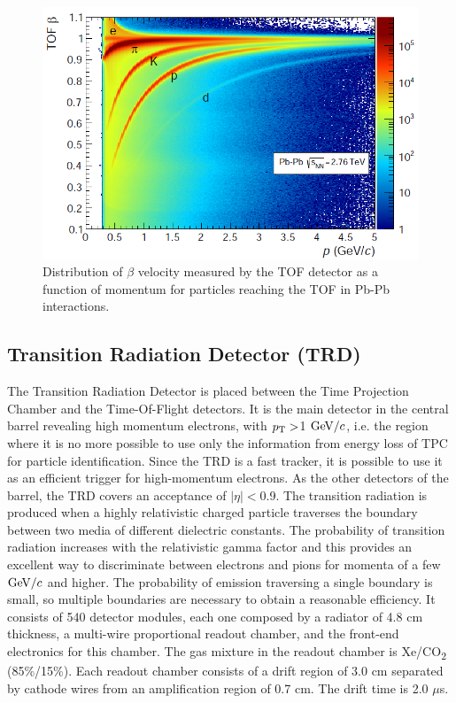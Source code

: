 \begin{figure}[!h]
\centering
\includegraphics[width=.7\textwidth]{FigCap3/TOFpid.png}
\caption{Distribution of $\beta$ velocity measured by the TOF detector as a function of momentum for particles reaching the
TOF in Pb-Pb interactions.}
\label{fig:TOFpid}
\end{figure}

\iffalse
\subsection{Transition Radiation Detector (TRD)}
The Transition Radiation Detector \cite{TRD-TDR} is placed between the
 Time Projection Chamber and the Time-Of-Flight detectors. It is the main 
 detector in the central barrel revealing high momentum electrons, with $p_{\rm T} >$1 $\mathrm{GeV}/c$, 
 i.e. the region where it is no more possible to use only the information from 
 energy loss of TPC for particle identification. Since the TRD is a fast tracker, 
 it is possible to use it as an efficient trigger for high-momentum electrons. 
 As the other detectors of the barrel, the TRD covers an acceptance of $|\eta|<$0.9.
The transition radiation is produced when a highly relativistic charged particle 
traverses the boundary between two media of different dielectric constants. 
The probability of transition radiation increases with the relativistic gamma factor 
and this provides an excellent way to discriminate between electrons and pions for
 momenta of a few $\mathrm{GeV}/c$ and higher. The probability of emission traversing 
 a single boundary is small, so multiple boundaries are necessary to obtain a reasonable efficiency.
It consists of 540 detector modules, each one composed by a radiator of 4.8 cm 
thickness, a multi-wire proportional readout chamber, and the front-end electronics
 for this chamber. The gas mixture in the readout chamber is Xe/CO\textsubscript{2} 
 (85\%/15\%). Each readout chamber consists of a drift region of 3.0 cm separated 
 by cathode wires from an amplification region of 0.7 cm. The drift time is 2.0 $\mu$s.




